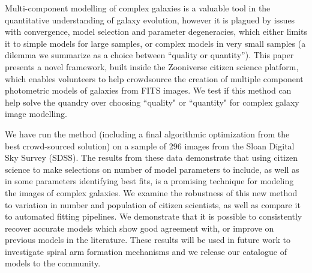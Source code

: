 \documentclass[../main.tex]{subfiles}
\begin{document}
Multi-component modelling of complex galaxies is a valuable tool in the quantitative understanding of galaxy evolution, however it is plagued by issues with convergence, model selection and parameter degeneracies, which either limits it to simple models for large samples, or complex models in very small samples  (a dilemma we summarize as a choice between “quality or quantity”). This paper presents a novel framework, built inside the Zooniverse citizen science platform, which enables volunteers to help crowdsource the creation of multiple component photometric models of galaxies from FITS images. We test if this method can help solve the quandry over choosing ``quality" or ``quantity" for complex galaxy image modelling.

We have run the method (including a final algorithmic optimization from the best crowd-sourced solution) on a sample of 296 images from the Sloan Digital Sky Survey (SDSS). The results from these data demonstrate that using citizen science to make selections on number of model parameters to include, as well as in some parameters identifying best fits, is a promising technique for modeling the images of complex galaxies. We examine the robustness of this new method to variation in number and population of citizen scientists, as well as compare it to automated fitting pipelines. We demonstrate that it is possible to consistently recover accurate models which show good agreement with, or improve on previous models in the literature. These results will be used in future work to investigate spiral arm formation mechanisms and we release our catalogue of models to the community.
\end{document}
